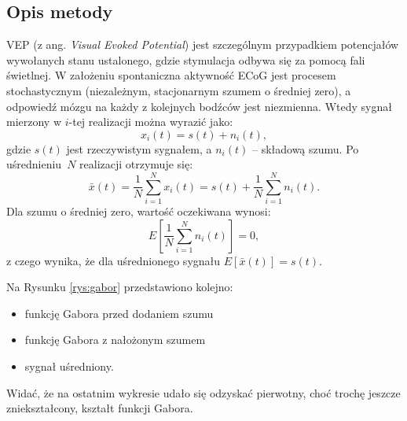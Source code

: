 \documentclass{pracamgr}
\begin{document}
	\subsection{Opis metody}
	VEP (z ang. \textit{Visual Evoked Potential}) jest szczególnym przypadkiem potencjałów wywołanych stanu ustalonego, gdzie stymulacja odbywa się za pomocą fali świetlnej. W założeniu spontaniczna aktywność ECoG jest procesem stochastycznym (niezależnym, stacjonarnym szumem o średniej zero), a odpowiedź mózgu na każdy z kolejnych bodźców jest niezmienna. Wtedy sygnał mierzony w $i$-tej realizacji można wyrazić jako:
	\begin{equation}
		x_i(t) = s(t) + n_i(t),
	\end{equation}
	gdzie $s(t)$ jest rzeczywistym sygnałem, a $n_i(t)$ -- składową szumu. Po uśrednieniu~$N$ realizacji otrzymuje się:
	\begin{equation}
		\bar{x}(t) = \frac{1}{N} \sum_{i=1}^{N} x_i(t) = s(t) + \frac{1}{N}\sum_{i=1}^{N} n_i(t).
	\end{equation}
	Dla szumu o średniej zero, wartość oczekiwana wynosi:
	\begin{equation}
		E\left[ \frac{1}{N}\sum_{i=1}^{N} n_i(t)\right] = 0, 
	\end{equation}
	z czego wynika, że dla uśrednionego sygnału $E\left[ \bar{x}(t) \right] = s(t).$
	
	Na Rysunku \ref{rys:gabor} przedstawiono kolejno:
	\begin{itemize}
		\item funkcję Gabora przed dodaniem szumu
		\item funkcję Gabora z nałożonym szumem
		\item sygnał uśredniony.
	\end{itemize}
	Widać, że na ostatnim wykresie udało się odzyskać pierwotny, choć trochę jeszcze zniekształcony, kształt funkcji Gabora.
\end{document}

